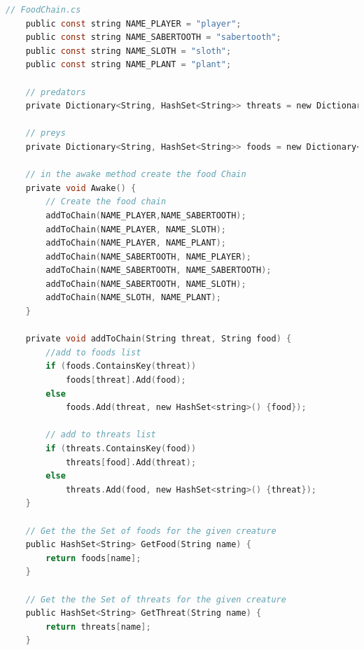 \documentclass[12pt]{report}
\begin{document}
\begin{lstlisting}[language=c]
// FoodChain.cs
    public const string NAME_PLAYER = "player";
    public const string NAME_SABERTOOTH = "sabertooth";
    public const string NAME_SLOTH = "sloth";
    public const string NAME_PLANT = "plant";

    // predators
    private Dictionary<String, HashSet<String>> threats = new Dictionary<string, HashSet<string>>();

    // preys
    private Dictionary<String, HashSet<String>> foods = new Dictionary<string, HashSet<string>>();

    // in the awake method create the food Chain
    private void Awake() {
        // Create the food chain
        addToChain(NAME_PLAYER,NAME_SABERTOOTH);
        addToChain(NAME_PLAYER, NAME_SLOTH);
        addToChain(NAME_PLAYER, NAME_PLANT);
        addToChain(NAME_SABERTOOTH, NAME_PLAYER);
        addToChain(NAME_SABERTOOTH, NAME_SABERTOOTH);
        addToChain(NAME_SABERTOOTH, NAME_SLOTH);
        addToChain(NAME_SLOTH, NAME_PLANT);
    }

    private void addToChain(String threat, String food) {
        //add to foods list
        if (foods.ContainsKey(threat)) 
            foods[threat].Add(food);
        else 
            foods.Add(threat, new HashSet<string>() {food});

        // add to threats list
        if (threats.ContainsKey(food)) 
            threats[food].Add(threat);
        else
            threats.Add(food, new HashSet<string>() {threat});
    }

    // Get the the Set of foods for the given creature
    public HashSet<String> GetFood(String name) {
        return foods[name];
    }
    
    // Get the the Set of threats for the given creature
    public HashSet<String> GetThreat(String name) {
        return threats[name];
    }
\end{lstlisting}
\end{document}
